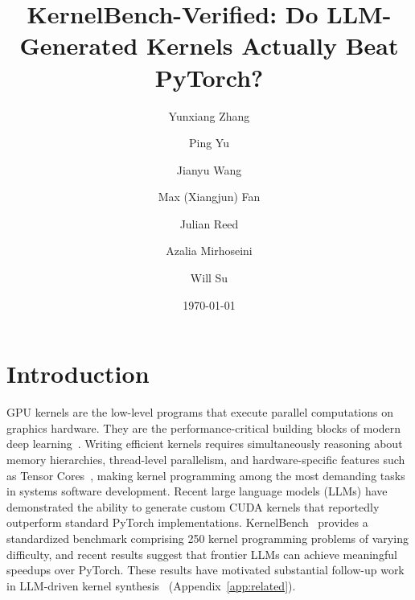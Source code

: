 \documentclass[]{fairmeta}
\title{KernelBench-Verified: Do LLM-Generated Kernels Actually Beat PyTorch?}
\author[1]{Yunxiang Zhang}
\author[2]{Ping Yu}
\author[1]{Jianyu Wang}
\author[1]{Max (Xiangjun) Fan}
\author[3]{Julian Reed}
\author[3]{Azalia Mirhoseini}
\author[1]{Will Su}
\affiliation[1]{Meta}
\affiliation[2]{FAIR at Meta SuperIntelligence Lab}
\affiliation[3]{Stanford University}
\date{\today}
\begin{document}
\maketitle

\section{Introduction}
\label{sec:intro}

GPU kernels are the low-level programs that execute parallel computations on graphics hardware. They are the performance-critical building blocks of modern deep learning~\citep{robustkbench,kernelbench}. Writing efficient kernels requires simultaneously reasoning about memory hierarchies, thread-level parallelism, and hardware-specific features such as Tensor Cores~\citep{nvidia_h200_datasheet,DBLP:journals/corr/abs-2602-24286}, making kernel programming among the most demanding tasks in systems software development. Recent large language models (LLMs) have demonstrated the ability to generate custom CUDA kernels that reportedly outperform standard PyTorch implementations. KernelBench~\citep{kernelbench} provides a standardized benchmark comprising 250 kernel programming problems of varying difficulty, and recent results suggest that frontier LLMs can achieve meaningful speedups over PyTorch. These results have motivated substantial follow-up work in LLM-driven kernel synthesis~\citep{cao2026k,DBLP:journals/corr/abs-2602-24286,du2026kernel,liu2026dr,wiedemann2026kernelfoundry} (Appendix~\ref{app:related}).

\end{document}

